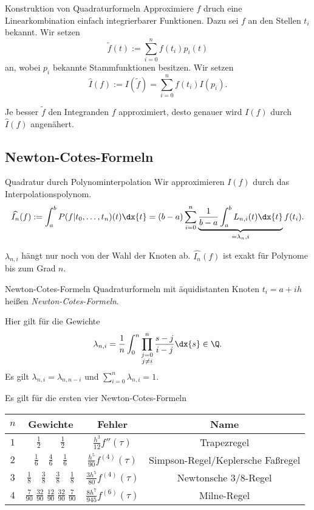 \begin{karte}{Konstruktion von Quadraturformeln}
    Approximiere \(f\) druch eine Linearkombination einfach integrierbarer Funktionen. 
    Dazu sei \(f\) an den Stellen \( t_i \) bekannt. Wir setzen 
    \[ \tilde{f}(t) := \sum_{i=0}^n f(t_i) p_i(t) \]
    an, wobei \( p_i \) bekannte Stammfunktionen besitzen. Wir setzen 
    \[ \widehat{I}(f) := I(\tilde{f}) = \sum_{i=0}^n f(t_i) I(p_i). \]
    
    Je besser \(\tilde{f}\) den Integranden \(f\) approximiert, desto genauer wird \( I(f) \) 
    durch \( \widehat{I}(f) \) angenähert.
\end{karte}

\subsection*{Newton-Cotes-Formeln}

\begin{karte}{Quadratur durch Polynominterpolation}
    Wir approximieren \(I(f)\) durch das Interpolationspolynom. 
    \[ \widehat{I_n}(f) := \int_a^b P(f|t_0,\ldots, t_n)(t) \dx{t} 
    = (b-a) \sum_{i=0}^n \underbrace{\frac{1}{b-a} \int_a^b L_{n,i}(t) \dx{t} }_{=\lambda_n,i} f(t_i). \]

    \( \lambda_{n,i} \) hängt nur noch von der Wahl der Knoten ab. 
    \( \widehat{I_n}(f) \) ist exakt für Polynome bis zum Grad \(n\).
\end{karte}

\begin{karte}{Newton-Cotes-Formeln}
    Quadraturformeln mit äquidistanten Knoten \( t_i = a + ih \)
    heißen \textit{Newton-Cotes-Formeln}.

    Hier gilt für die Gewichte 
    \[ \lambda_{n,i} = \frac{1}{n} \int_0^n \prod_{\substack{j=0\\j\neq i}}^n \frac{s-j}{i-j} \dx{s} \in \Q. \]
    Es gilt \( \lambda_{n,i} = \lambda_{n,n-i} \) und \( \sum_{i=0}^n \lambda_{n,i} = 1 \).

    Es gilt für die ersten vier Newton-Cotes-Formeln 
    \begin{center}
    \begin{tabular}{c|c|c|c}
        \(n\) & Gewichte & Fehler & Name \\[10pt]\hline
        \( 1 \) & \( \frac{1}{2} \qquad \frac{1}{2} \) & \( \frac{h^3}{12} f''(\tau) \) & Trapezregel\\[10pt]
        \(2\) & \( \frac{1}{6} \quad \frac{4}{6} \quad \frac{1}{6} \) & \( \frac{h^5}{90} f^{(4)}(\tau) \) & Simpson-Regel/Keplersche Faßregel \\[10pt]
        \(3\) & \( \frac{1}{8} \quad \frac{3}{8} \quad \frac{3}{8} \quad \frac{1}{8} \) & \( \frac{3h^5}{80} f^{(4)}(\tau) \) & Newtonsche 3/8-Regel \\[10pt]
        \( 4 \) & \( \frac{7}{90} \; \frac{32}{90} \; \frac{12}{90} \; \frac{32}{90} \; \frac{7}{90} \) & \( \frac{8h^7}{945} f^{(6)}(\tau) \) & Milne-Regel
    \end{tabular}
    \end{center}
    
\end{karte}

